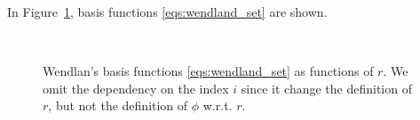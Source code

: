 \documentclass[fleqn, 11pt]{article}
\theoremstyle{definition}
\theoremstyle{plain}
\theoremstyle{remark}
\begin{document}
In Figure~\ref{fig:wend_plot}, basis functions \eqref{eqs:wendland_set} are shown.

\begin{figure}[tbp]
    \centering
     \\
    \caption{Wendlan's basis functions \eqref{eqs:wendland_set} as functions of $r$.
    We omit the dependency on the index $i$ since it change the definition of $r$, but not the definition of $ \phi $ w.r.t. $r$.}
    \label{fig:wend_plot}
\end{figure}
\end{document}
